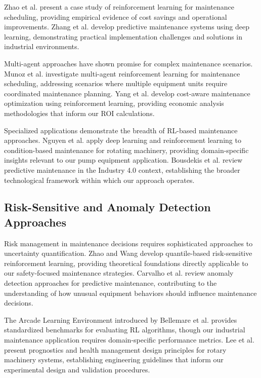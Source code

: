 \documentclass[twocolumn]{article}
\begin{document}
Zhao et al.\cite{zhao2019rlmaintenance} present a case study of reinforcement learning for maintenance scheduling, providing empirical evidence of cost savings and operational improvements. Zhang et al.\cite{zhang2020predictive} develop predictive maintenance systems using deep learning, demonstrating practical implementation challenges and solutions in industrial environments.

Multi-agent approaches have shown promise for complex maintenance scenarios. Munoz et al.\cite{munoz2019multiagent} investigate multi-agent reinforcement learning for maintenance scheduling, addressing scenarios where multiple equipment units require coordinated maintenance planning. Yang et al.\cite{yang2020costaware} develop cost-aware maintenance optimization using reinforcement learning, providing economic analysis methodologies that inform our ROI calculations.

Specialized applications demonstrate the breadth of RL-based maintenance approaches. Nguyen et al.\cite{nguyen2022cbm} apply deep learning and reinforcement learning to condition-based maintenance for rotating machinery, providing domain-specific insights relevant to our pump equipment application. Bousdekis et al.\cite{bousdekis2019industry} review predictive maintenance in the Industry 4.0 context, establishing the broader technological framework within which our approach operates.

\subsection{Risk-Sensitive and Anomaly Detection Approaches}

Risk management in maintenance decisions requires sophisticated approaches to uncertainty quantification. Zhao and Wang\cite{zhao2021quantilerisk} develop quantile-based risk-sensitive reinforcement learning, providing theoretical foundations directly applicable to our safety-focused maintenance strategies. Carvalho et al.\cite{carvalho2019anomaly} review anomaly detection approaches for predictive maintenance, contributing to the understanding of how unusual equipment behaviors should influence maintenance decisions.

The Arcade Learning Environment introduced by Bellemare et al.\cite{bellemare2013arcade} provides standardized benchmarks for evaluating RL algorithms, though our industrial maintenance application requires domain-specific performance metrics. Lee et al.\cite{lee2014phm} present prognostics and health management design principles for rotary machinery systems, establishing engineering guidelines that inform our experimental design and validation procedures.
\end{document}

